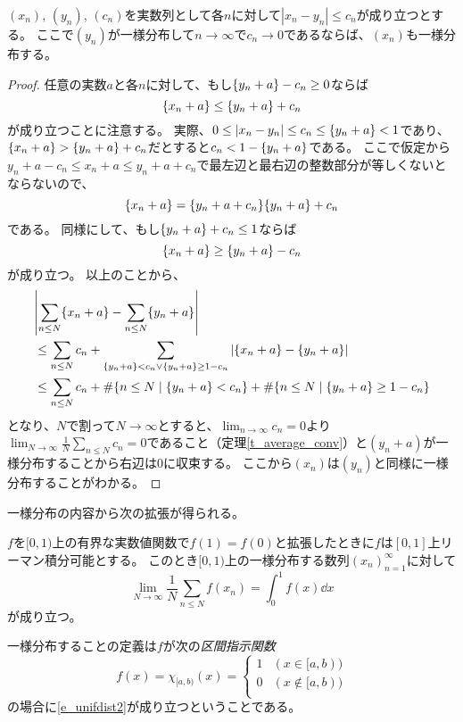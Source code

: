 \begin{proposition}
$(x_n)$, $(y_n)$, $(c_n)$を実数列として各$n$に対して$|x_n-y_n| \le c_n$が成り立つとする。
ここで$(y_n)$が一様分布して$n \to \infty$で$c_n \to 0$であるならば、$(x_n)$も一様分布する。
\end{proposition}

\begin{proof}
任意の実数$a$と各$n$に対して、もし$\{y_n+a\}-c_n \ge 0$ならば
$$
\{x_n+a\} \le \{y_n+a\}+c_n
$$
が成り立つことに注意する。
実際、$0 \le |x_n-y_n| \le c_n \le \{y_n+a\} < 1$であり、$\{x_n+a\} > \{y_n+a\}+c_n$だとすると$c_n < 1-\{y_n+a\}$である。
ここで仮定から$y_n+a-c_n \le x_n+a \le y_n+a+c_n$で最左辺と最右辺の整数部分が等しくないとならないので、
$$
\{x_n+a\} = \{y_n+a+c_n\} \{y_n+a\}+c_n
$$
である。
同様にして、もし$\{y_n+a\}+c_n \le 1$ならば
$$
\{x_n+a\} \ge \{y_n+a\}-c_n
$$
が成り立つ。
以上のことから、
$$
\begin{aligned}
&\abs{\sum_{n \le N}\{x_n+a\}-\sum_{n \le N}\{y_n+a\}} \\
&\le \sum_{n \le N}c_n+\sum_{\{y_n+a\} < c_n \lor \{y_n+a\} \ge 1-c_n}|\{x_n+a\}-\{y_n+a\}| \\
&\le \sum_{n \le N}c_n+\#\{ n \le N \mid \{y_n+a\} < c_n \}+\#\{ n \le N \mid \{y_n+a\} \ge 1-c_n \}
\end{aligned}
$$
となり、$N$で割って$N \to \infty$とすると、$\lim_{n \to \infty}c_n = 0$より$\lim_{N \to \infty}\frac{1}{N}\sum_{n \le N}c_n = 0$であること（定理\ref{t_average_conv}）と$(y_n+a)$が一様分布することから右辺は$0$に収束する。
ここから$(x_n)$は$(y_n)$と同様に一様分布することがわかる。
\end{proof}

一様分布の内容から次の拡張が得られる。

\begin{proposition}
$f$を$[0, 1)$上の有界な実数値関数で$f(1) = f(0)$と拡張したときに$f$は$[0, 1]$上リーマン積分可能とする。
このとき$[0, 1)$上の一様分布する数列$(x_n)_{n = 1}^\infty$に対して
\begin{equation}
\label{e_unifdist2}
\lim_{N \to \infty}\frac{1}{N}\sum_{n \le N}f(x_n) = \int_0^1 f(x)\dd{x}
\end{equation}
が成り立つ。
\end{proposition}

\begin{remark}
一様分布することの定義は$f$が次の\emph{区間指示関数}
$$
f(x) = \chi_{[a, b)}(x) =
\begin{cases}
1 & (x \in [a, b)) \\
0 & (x \notin [a, b)) \\
\end{cases}
$$
の場合に\eqref{e_unifdist2}が成り立つということである。
\end{remark}

